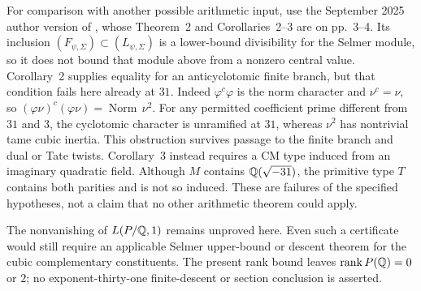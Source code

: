 For comparison with another possible arithmetic input, use the
September 2025 author version of \citet{Hsieh2014}, whose
Theorem~2 and Corollaries~2--3 are on pp.~3--4.
Its inclusion $(F_{\psi,\Sigma})\subset(L_{\psi,\Sigma})$
is a lower-bound divisibility for the Selmer module, so it does
not bound that module above from a nonzero central value.
Corollary~2 supplies equality for an anticyclotomic finite branch,
but that condition fails here already at $31$.
Indeed $\varphi^c\varphi$ is the norm character and
$\nu^c=\nu$, so
$(\varphi\nu)^c(\varphi\nu)=\operatorname{Norm}\,\nu^2$.
For any permitted coefficient prime different from $31$ and $3$,
the cyclotomic character is unramified at $31$, whereas $\nu^2$
has nontrivial tame cubic inertia. This obstruction survives
passage to the finite branch and dual or Tate twists.
Corollary~3 instead requires a CM type induced from an imaginary
quadratic field. Although $M$ contains $\mathbb Q(\sqrt{-31})$, the
primitive type $T$ contains both parities and is not so induced.
These are failures of the specified hypotheses, not a claim that
no other arithmetic theorem could apply.

The nonvanishing of $L(P/\mathbb Q,1)$ remains unproved here.
Even such a certificate would still require an applicable Selmer
upper-bound or descent theorem for the cubic complementary
constituents. The present rank bound leaves
$\operatorname{rank}P(\mathbb Q)=0$ or $2$; no exponent-thirty-one
finite-descent or section conclusion is asserted.
